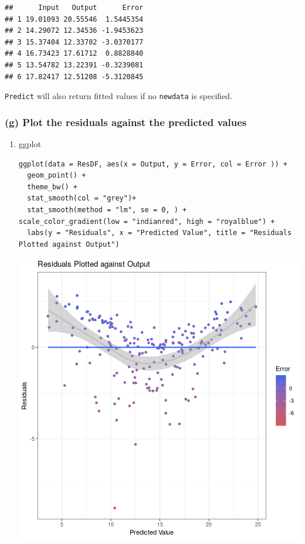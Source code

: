 \documentclass[11pt]{article}
\begin{document}
\begin{verbatim}
##      Input   Output      Error
## 1 19.01093 20.55546  1.5445354
## 2 14.29072 12.34536 -1.9453623
## 3 15.37404 12.33702 -3.0370177
## 4 16.73423 17.61712  0.8828840
## 5 13.54782 13.22391 -0.3239081
## 6 17.82417 12.51208 -5.3120845
\end{verbatim}

\texttt{Predict} will also return fitted values if no \texttt{newdata} is specified.

\subsubsection{(g) Plot the residuals against the predicted values}
\label{sec:org990aad3}
\begin{enumerate}
\item ggplot
\label{sec:org831a573}
\begin{verbatim}
ggplot(data = ResDF, aes(x = Output, y = Error, col = Error )) +
  geom_point() +
  theme_bw() +
  stat_smooth(col = "grey")+
  stat_smooth(method = "lm", se = 0, ) +
scale_color_gradient(low = "indianred", high = "royalblue") +
  labs(y = "Residuals", x = "Predicted Value", title = "Residuals Plotted against Output")
\end{verbatim}

\begin{center}
\includegraphics[width=.9\linewidth]{ResidualPlotMultLinRegIntroDataSci.png}
\end{center}


\end{enumerate}
\end{document}
